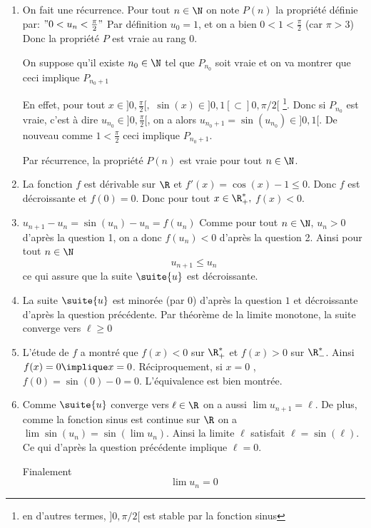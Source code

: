 \documentclass[a4paper, 11pt,reqno]{article}
\begin{document}
\begin{correction}
\begin{enumerate}
\item On fait une récurrence. 
Pour tout $n\in \N$ on note  $P(n)$ la propriété définie par:  $" 0<u_n<\frac{\pi}{2}"$
Par définition $u_0= 1$, et on a bien $0<1<\frac{\pi}{2}$ (car $\pi>3$) 
Donc la propriété $P$ est vraie au rang $0$.  

 On suppose qu'il existe $n_0\in \N$ tel que $P_{n_0}$ soit vraie et on  va montrer que ceci implique $P_{n_0+1}$ 

En effet, pour tout $x\in ]0,\frac{\pi}{2}[,$ $\sin(x) \in ]0,1[\subset ]0,\pi/2[$ \footnote{en d'autres termes, $]0,\pi/2[ $ est stable par la fonction sinus}. Donc 
si $P_{n_0}$ est vraie, c'est à dire  $u_{n_0} \in  ]0,\frac{\pi}{2}[ $, on a  alors $u_{n_0+1}=\sin(u_{n_0}) \in ]0,1[$.
De nouveau comme $1< \frac{\pi}{2}$ ceci implique $P_{n_0+1}$. 

Par récurrence, la propriété $P(n)$ est vraie pour tout $n\in \N$. 


\item  La fonction $f$ est dérivable sur $\R$ et $f'(x) =\cos(x)-1\leq 0$. 
Donc $f$ est décroissante et $f(0)=0$. Donc pour tout $x\in \R_+^*,$ $f(x)< 0$.
\item $u_{n+1}-u_n =\sin(u_n)-u_n=f(u_n)$
Comme pour tout $n\in \N$, $u_n>0$ d'après la question 1, on a donc 
$f(u_n) <0$ d'après la question 2. Ainsi pour tout $n\in \N$
$$u_{n+1} \leq u_n$$ ce qui assure que la suite $\suite{u}$ est décroissante. 

\item La suite $\suite{u}$ est minorée (par 0) d'après la question $1$ et décroissante d'après la question précédente. Par théorème de la limite monotone, la suite converge vers $\ell \geq 0$ 

\item L'étude de $f$ a montré que $f(x)<0$ sur $\R^*_+$  et $f(x)>0$ sur $\R^*_-$. Ainsi $f(x)=0 \implique x=0$. Réciproquement, si $x=0$ , $f(0) =\sin(0)-0=0$. L'équivalence est bien montrée. 

\item Comme $\suite{u}$ converge vers $\ell\in \R$ on a aussi 
$\lim u_{n+1} =\ell$. De plus, comme la fonction sinus est continue sur $\R$ on a $\lim \sin(u_n) = \sin(\lim u_n) $. Ainsi la limite $\ell$ satisfait  $\ell =\sin(\ell)$. Ce qui d'après la question précédente implique $\ell=0$. 

Finalement $$\lim u_n= 0$$


\end{enumerate}
\end{correction}
\end{document}
